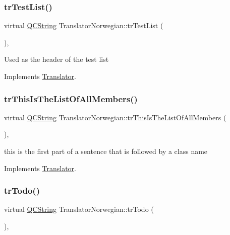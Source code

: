 \subsubsection{\texorpdfstring{trTestList()}{trTestList()}}
{\footnotesize\ttfamily virtual \mbox{\hyperlink{class_q_c_string}{Q\+C\+String}} Translator\+Norwegian\+::tr\+Test\+List (\begin{DoxyParamCaption}{ }\end{DoxyParamCaption})\hspace{0.3cm}{\ttfamily [inline]}, {\ttfamily [virtual]}}

Used as the header of the test list 

Implements \mbox{\hyperlink{class_translator}{Translator}}.

\mbox{\label{class_translator_norwegian_acf451810ff968f76cd5c729ce9540808}} 
\subsubsection{\texorpdfstring{trThisIsTheListOfAllMembers()}{trThisIsTheListOfAllMembers()}}
{\footnotesize\ttfamily virtual \mbox{\hyperlink{class_q_c_string}{Q\+C\+String}} Translator\+Norwegian\+::tr\+This\+Is\+The\+List\+Of\+All\+Members (\begin{DoxyParamCaption}{ }\end{DoxyParamCaption})\hspace{0.3cm}{\ttfamily [inline]}, {\ttfamily [virtual]}}

this is the first part of a sentence that is followed by a class name 

Implements \mbox{\hyperlink{class_translator}{Translator}}.

\mbox{\label{class_translator_norwegian_a8078fc6d735d389ae864ed6e9416803d}} 
\subsubsection{\texorpdfstring{trTodo()}{trTodo()}}
{\footnotesize\ttfamily virtual \mbox{\hyperlink{class_q_c_string}{Q\+C\+String}} Translator\+Norwegian\+::tr\+Todo (\begin{DoxyParamCaption}{ }\end{DoxyParamCaption})\hspace{0.3cm}{\ttfamily [inline]}, {\ttfamily [virtual]}}


